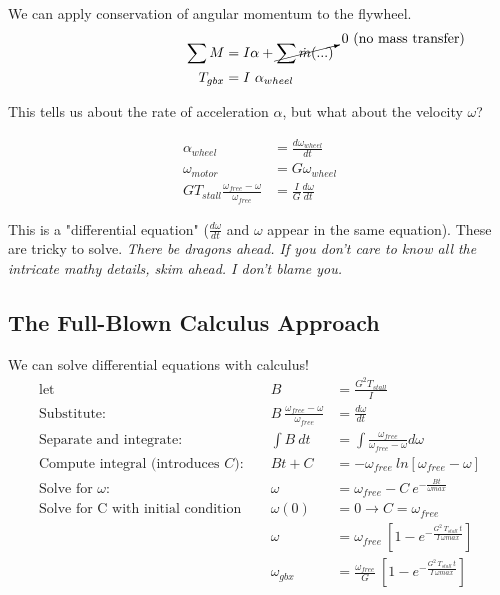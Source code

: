 \documentclass[10pt,letterpaper]{book}
\begin{document}
	We can apply conservation of angular momentum to the flywheel.
	\begin{align}
		\sum M &= I \alpha + \cancelto{0 \ \mbox{(no mass transfer)}}{\sum \dot{m}(...)} \\
		T_{gbx} &= I \ \alpha_{wheel}
	\end{align}
	
	This tells us about the rate of acceleration $\alpha$, but what about the velocity $\omega$? 
		
	\begin{align}
		\alpha_{wheel} &= \frac{d \omega_{wheel}}{dt} \\
		\omega_{motor} &= G \omega_{wheel} \\
		G T_{stall} \frac{\omega_{free} - \omega}{\omega_{free}} &= \frac{I}{G} \frac{d \omega}{dt}
	\end{align}
	
		This is a "differential equation" ($\frac{d \omega}{dt}$ and $\omega$ appear in the same equation). These are tricky to solve. \textit{There be dragons ahead. If you don't care to know all the intricate mathy details, skim ahead. I don't blame you.}
		
	\subsection{The Full-Blown Calculus Approach}
	
	We can solve differential equations with calculus!	
	\begin{align}
		\mbox{let }& &B  &= \frac{G^2 T_{stall}}{I} \\
		\mbox{Substitute: }& & B\ \frac{\omega_{free} - \omega}{\omega_{free}} &= \frac{d \omega}{d t} \\
		\mbox{Separate and integrate: }& & \int B\ dt &= \int \frac{\omega_{free}}{\omega_{free} - \omega} d \omega \\
		\mbox{Compute integral (introduces $C$): }& & B t + C &= -\omega_{free}\ ln[\omega_{free} - \omega] \\
		\mbox{Solve for $\omega$: }& & \omega &= \omega_{free} - C\ e^{-\frac{B t}{\omega{max}}} \\
		\mbox{Solve for C with initial condition }& & \omega(0) &= 0 \rightarrow C = \omega_{free} \\
		& &\omega &= \omega_{free}\ [1 - e^{-\frac{G^2\ T_{stall}\ t}{I\ \omega{max}}}] \\
		& &\omega_{gbx} &= \frac{\omega_{free}}{G}\ [1 - e^{-\frac{G^2\ T_{stall}\ t}{I\ \omega{max}}}]
	\end{align}	
	
\end{document}
